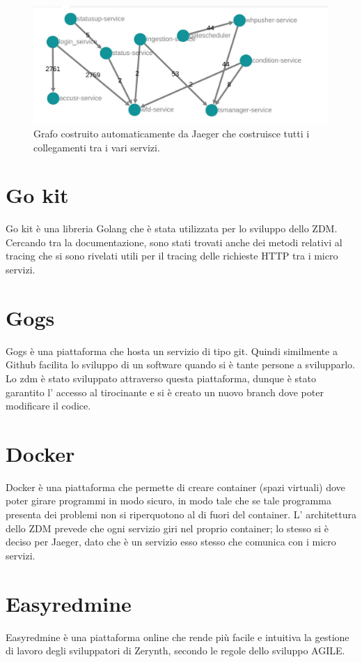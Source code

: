 \documentclass[a4paper,12pt,titlepage,italian,openany]{report}
\begin{document}
\begin{figure}[H]
    \includegraphics[scale=0.4]{grafo.jpg}
    \centering
    \caption{Grafo costruito automaticamente da Jaeger che costruisce tutti i collegamenti tra i vari servizi.}
\end{figure}

\section{Go kit}
Go kit\cite{go:2} è una libreria Golang che è stata utilizzata per lo sviluppo dello ZDM\cite{zdm:1}. Cercando tra la documentazione, sono stati trovati anche dei metodi relativi al tracing che si sono rivelati utili
per il tracing delle richieste HTTP tra i micro servizi. 
\section{Gogs}
Gogs\cite{gogs:1} è una piattaforma che hosta un servizio di tipo git. Quindi similmente a Github facilita lo sviluppo di un software quando si è tante persone a svilupparlo. Lo zdm è stato sviluppato attraverso questa piattaforma, dunque è stato garantito l' accesso al tirocinante e si è creato un nuovo branch dove poter modificare il codice. 

\section{Docker}
Docker\cite{docker:1} è una piattaforma che permette di creare container (spazi virtuali) dove poter girare programmi in modo sicuro, in modo tale che se tale programma presenta dei problemi non si riperquotono al di fuori del container. L' architettura dello ZDM\cite{zdm:1} prevede che ogni servizio giri nel proprio container; lo stesso si è deciso per Jaeger, dato che è un servizio esso stesso che comunica con i micro servizi.
\section{Easyredmine}
Easyredmine\cite{easyredmine:1} è una piattaforma online che rende più facile e intuitiva la gestione di lavoro degli sviluppatori di Zerynth, secondo le regole dello sviluppo AGILE.
\end{document}
